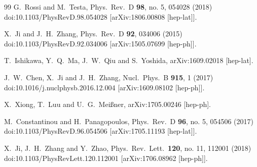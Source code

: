 \begin{thebibliography}{99}
  G.~Rossi and M.~Testa,
  Phys.\ Rev.\ D {\bf 98}, no. 5, 054028 (2018)
  doi:10.1103/PhysRevD.98.054028
  [arXiv:1806.00808 [hep-lat]].


  X.~Ji and J.~H.~Zhang,
  Phys.\ Rev.\ D {\bf 92}, 034006 (2015)
  doi:10.1103/PhysRevD.92.034006
  [arXiv:1505.07699 [hep-ph]].


  T.~Ishikawa, Y.~Q.~Ma, J.~W.~Qiu and S.~Yoshida,
  arXiv:1609.02018 [hep-lat].


  J.~W.~Chen, X.~Ji and J.~H.~Zhang,
  Nucl.\ Phys.\ B {\bf 915}, 1 (2017)
  doi:10.1016/j.nuclphysb.2016.12.004
  [arXiv:1609.08102 [hep-ph]].


  X.~Xiong, T.~Luu and U.~G.~Mei{\ss}ner,
  arXiv:1705.00246 [hep-ph].


  M.~Constantinou and H.~Panagopoulos,
  Phys.\ Rev.\ D {\bf 96}, no. 5, 054506 (2017)
  doi:10.1103/PhysRevD.96.054506
  [arXiv:1705.11193 [hep-lat]].


  X.~Ji, J.~H.~Zhang and Y.~Zhao,
  Phys.\ Rev.\ Lett.\  {\bf 120}, no. 11, 112001 (2018)
  doi:10.1103/PhysRevLett.120.112001
  [arXiv:1706.08962 [hep-ph]].



\end{thebibliography}

